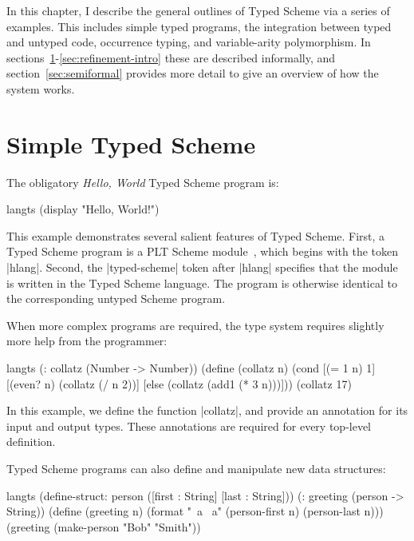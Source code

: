 \begin{schemeregion}
\label{sec:informal}

In this chapter, I describe the general outlines of Typed
Scheme  via  a series of examples.  This includes simple typed
programs, the integration between 
typed and untyped code, occurrence typing, and variable-arity
polymorphism.  In
sections~\ref{sec:simple}-\ref{sec:refinement-intro}
these are described informally, 
and section~\ref{sec:semiformal} provides more detail to give an overview of how the
system works.  

\section{Simple Typed Scheme}
\label{sec:simple}
The obligatory {\it Hello, World}  Typed Scheme program is:

\begin{exmp}
\begin{schemedisplay}
langts
(display "Hello, World!\n")
\end{schemedisplay}
\label{ex:hello}
\end{exmp}
\noindent
This example demonstrates several salient features of Typed Scheme.
First, a Typed Scheme program is a PLT Scheme
module~\cite{f:modules}, which begins with the token \scheme|hlang|.
Second, the \scheme|typed-scheme| token after \scheme|hlang| specifies
that the module is written in the Typed Scheme 
language.  The program is otherwise identical to the
corresponding untyped Scheme program.  

When more complex programs are required, the type system requires
slightly more help from the programmer:

\begin{exmp}
\begin{schemedisplay}
langts
(: collatz (Number -> Number))
(define (collatz n)
  (cond 
   [(= 1 n) 1]
   [(even? n)
    (collatz (/ n 2))]
   [else (collatz (add1 (* 3 n)))]))
(collatz 17)
\end{schemedisplay}
\label{ex:collatz}
\end{exmp}

\noindent
In this example, we define the function \scheme|collatz|, and provide
an annotation for its input and output types.  These annotations are
required for every top-level definition.  

Typed Scheme programs can also define and manipulate new data structures:

\begin{exmp}
\begin{schemedisplay}
langts
(define-struct: person ([first : String] [last : String]))
(: greeting (person -> String))
(define (greeting n)
  (format "~a ~a" (person-first n) (person-last n)))
(greeting (make-person "Bob" "Smith"))
\end{schemedisplay}
\label{ex:struct}
\end{exmp}


\end{schemeregion}
